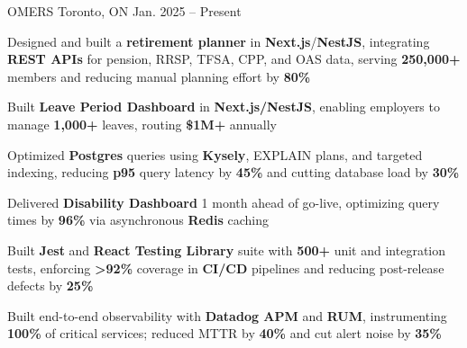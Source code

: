 \documentclass[11pt, a4paper]{awesome-cv}
\begin{document}
\makecvheader[C]


\begin{cventries}


  \cventry
    {\color{lightblue}{ASSOCIATE FULL-STACK ENGINEER}}
    {OMERS}
    {Toronto, ON}
    {Jan. 2025 -- Present}
    {
      \begin{cvitems}
        \item{Designed and built a \textbf{retirement planner} in \textbf{Next.js}/\textbf{NestJS}, integrating \textbf{REST APIs} for pension, RRSP, TFSA, CPP, and OAS data, serving \textbf{250,000+} members and reducing manual planning effort by \textbf{80\%}}
        \item{Built \textbf{Leave Period Dashboard} in \textbf{Next.js/NestJS}, enabling employers to manage \textbf{1,000+} leaves, routing \textbf{\$1M+} annually}
        \item{Optimized \textbf{Postgres} queries using \textbf{Kysely}, EXPLAIN plans, and targeted indexing, reducing \textbf{p95} query latency by \textbf{45\%} and cutting database load by \textbf{30\%}}
        \item{Delivered \textbf{Disability Dashboard} 1 month ahead of go-live, optimizing query times by \textbf{96\%} via asynchronous \textbf{Redis} caching}
        \item{Built \textbf{Jest} and \textbf{React Testing Library} suite with \textbf{500+} unit and integration tests, enforcing \textbf{>92\%} coverage in \textbf{CI/CD} pipelines and reducing post-release defects by \textbf{25\%}}
        \item{Built end-to-end observability with \textbf{Datadog APM} and \textbf{RUM}, instrumenting \textbf{100\%} of critical services; reduced MTTR by \textbf{40\%} and cut alert noise by \textbf{35\%}}
      \end{cvitems}
    }


\end{cventries}
\end{document}
